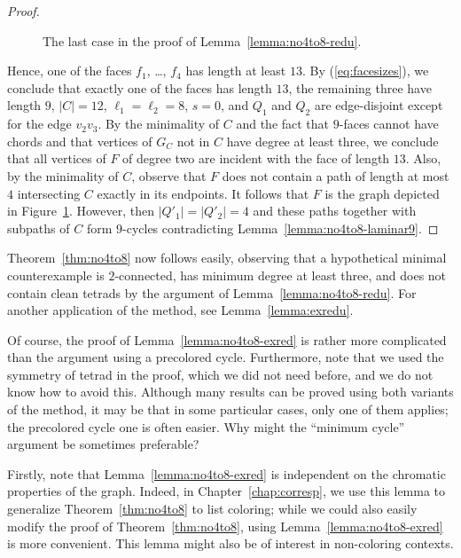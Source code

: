 \documentclass[12pt,twoside,openright,a4paper]{book}
\begin{document}
\begin{proof}
\begin{figure}
\begin{center}
\begin{asy}
\end{asy}
\end{center}
\caption{The last case in the proof of Lemma~\ref{lemma:no4to8-redu}.}\label{fig:no4to8-lastcase}
\end{figure}

Hence, one of the faces $f_1$, \ldots, $f_4$ has length at least $13$.  By (\ref{eq:facesizes}), we conclude that exactly one of the faces has length $13$,
the remaining three have length $9$, $|C|=12$, $\ell_1=\ell_2=8$, $s=0$, and $Q_1$ and $Q_2$ are edge-disjoint except for the edge $v_2v_3$.
By the minimality of $C$ and the fact that $9$-faces cannot have chords and that vertices of $G_C$ not in $C$ have degree at least three,
we conclude that all vertices of $F$ of degree two are incident with the face of length $13$.  Also, by the minimality of $C$, observe that $F$ does
not contain a path of length at most $4$ intersecting $C$ exactly in its endpoints.  It follows that $F$ is the graph depicted in Figure~\ref{fig:no4to8-lastcase}.
However, then $|Q'_1|=|Q'_2|=4$ and these paths together with subpaths of $C$ form $9$-cycles contradicting Lemma~\ref{lemma:no4to8-laminar9}.
\end{proof}

Theorem~\ref{thm:no4to8} now follows easily, observing that a hypothetical minimal counterexample is $2$-connected,
has minimum degree at least three, and does not contain clean tetrads by the argument of Lemma~\ref{lemma:no4to8-redu}.
For another application of the method, see Lemma~\ref{lemma:exredu}.

Of course, the proof of Lemma~\ref{lemma:no4to8-exred} is rather more complicated than the argument using a precolored cycle.
Furthermore, note that we used the symmetry of tetrad in the proof, which we did not need before, and we do not know how
to avoid this.
Although many results can be proved using both variants of the method, it may be that in some particular cases,
only one of them applies; the precolored cycle one is often easier.  Why might the ``minimum cycle'' argument be
sometimes preferable?

Firstly, note that Lemma~\ref{lemma:no4to8-exred} is independent on the chromatic properties of the graph.  Indeed, in Chapter~\ref{chap:corresp},
we use this lemma to generalize Theorem~\ref{thm:no4to8} to list coloring; while we could also easily modify the proof of Theorem~\ref{thm:no4to8},
using Lemma~\ref{lemma:no4to8-exred} is more convenient.  This lemma might also be of interest in non-coloring contexts.
\end{document}
